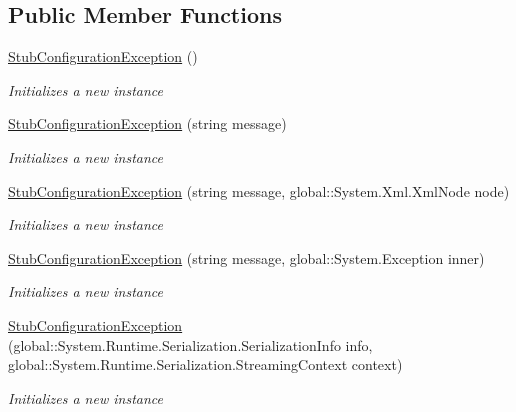 \subsection*{Public Member Functions}
\begin{DoxyCompactItemize}
\item 
\hyperlink{class_system_1_1_configuration_1_1_fakes_1_1_stub_configuration_exception_adb49f8d590cc973029c31d5222c02ddd}{Stub\-Configuration\-Exception} ()
\begin{DoxyCompactList}\small\item\em Initializes a new instance\end{DoxyCompactList}\item 
\hyperlink{class_system_1_1_configuration_1_1_fakes_1_1_stub_configuration_exception_a5063614494dc459ed75fc3a099347164}{Stub\-Configuration\-Exception} (string message)
\begin{DoxyCompactList}\small\item\em Initializes a new instance\end{DoxyCompactList}\item 
\hyperlink{class_system_1_1_configuration_1_1_fakes_1_1_stub_configuration_exception_a537498e940c48ce0bc17474ba2b5b362}{Stub\-Configuration\-Exception} (string message, global\-::\-System.\-Xml.\-Xml\-Node node)
\begin{DoxyCompactList}\small\item\em Initializes a new instance\end{DoxyCompactList}\item 
\hyperlink{class_system_1_1_configuration_1_1_fakes_1_1_stub_configuration_exception_a4aeefc324c35502ce92acad6155c2f18}{Stub\-Configuration\-Exception} (string message, global\-::\-System.\-Exception inner)
\begin{DoxyCompactList}\small\item\em Initializes a new instance\end{DoxyCompactList}\item 
\hyperlink{class_system_1_1_configuration_1_1_fakes_1_1_stub_configuration_exception_a6ac07e8118b4115d75a3414ca623d62b}{Stub\-Configuration\-Exception} (global\-::\-System.\-Runtime.\-Serialization.\-Serialization\-Info info, global\-::\-System.\-Runtime.\-Serialization.\-Streaming\-Context context)
\begin{DoxyCompactList}\small\item\em Initializes a new instance\end{DoxyCompactList}\item 

\end{DoxyCompactItemize}

